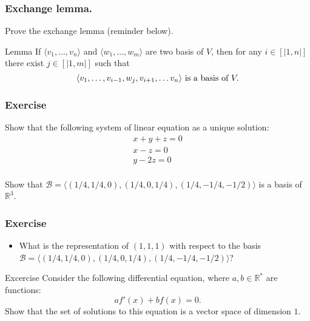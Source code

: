 \documentclass{beamer}
\begin{document}
\begin{frame}
  \frametitle{Exchange lemma.}
  Prove the exchange lemma (reminder below).
  
  \begin{block}{Lemma}
    If $\langle v_1, \dots, v_n \rangle$ and $\langle w_1, \dots, w_m \rangle$ are two basis of $V$, then for any $i \in [|1, n|]$ there exist $j \in [|1, m|]$ such that
    \[\langle v_{1}, \dots, v_{i-1}, w_j, v_{i+1}, \dots v_n \rangle \textnormal{ is a basis of } V.\]
  \end{block}
  
\end{frame}

\begin{frame}
  \frametitle{Exercise}
  Show that the following system of linear equation as a unique solution:
  \[
  \begin{array}{l}
    x + y + z = 0\\
    x - z = 0 \\
    y - 2z = 0\\
  \end{array}
  \]

  Show that $\mathcal{B} = \langle (1/4, 1/4, 0), (1/4,0,1/4), (1/4, -1/4, -1/2) \rangle$ is a basis of $\mathbb{R}^3$.
 
\end{frame}

\begin{frame}
  \frametitle{Exercise}
  \begin{itemize}
  \item What is the representation of $(1,1,1)$ with respect to the basis $\mathcal{B} = \langle (1/4, 1/4, 0), (1/4,0,1/4), (1/4, -1/4, -1/2) \rangle$?
  \end{itemize}
\end{frame}

\begin{frame}{Excercise}
  Consider the following differential equation, where $a, b \in \mathbb{R}^*$ are functions:
  \[ af'(x) + bf(x) = 0.\]
  Show that the set of solutions to this equation is a vector space of dimension $1$.
\end{frame}
\end{document}
